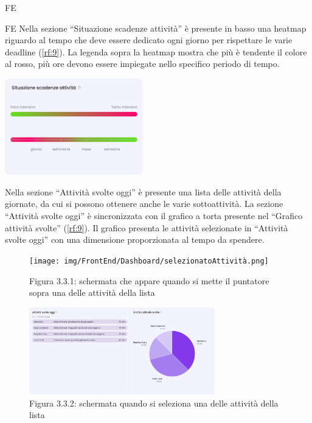 \begin{listaPersonale}{FE}
\begin{listaPersonale2}{FE}
         Nella sezione “Situazione scadenze attività” è presente in basso una heatmap riguardo al tempo che deve essere dedicato ogni giorno per rispettare le varie deadline (\ref{rf:9}). La legenda sopra la heatmap mostra che più è tendente il colore al rosso, più ore devono essere impiegate nello specifico periodo di tempo.
        \begin{center}
            \includegraphics[width=0.45\textwidth,height=0.18\textheight]{img/FrontEnd/Dashboard/heatMap.png} %
        \end{center}
        
         Nella sezione “Attività svolte oggi” è presente una lista delle attività della giornate, da cui si possono ottenere anche le varie sottoattività. 
        La sezione “Attività svolte oggi” è sincronizzata con il grafico a torta presente nel “Grafico attività svolte” (\ref{rf:9}). Il grafico presenta le attività selezionate in “Attività svolte oggi” con una dimensione proporzionata al tempo da spendere.

        \begin{figure}[H]
            \centering
            \texttt{[image: img/FrontEnd/Dashboard/selezionatoAttività.png]}
            \caption{Figura 3.3.1: schermata che appare quando si mette il puntatore sopra una delle attività della lista}
        \end{figure}

        \begin{figure}[H]
            \centering
            \includegraphics[width=0.72\textwidth,height=0.2\textheight]{img/FrontEnd/Dashboard/Dashboard3.png}
            \caption{Figura 3.3.2: schermata quando si seleziona una delle attività della lista}
        \end{figure}
           

\end{listaPersonale2}
\end{listaPersonale}
